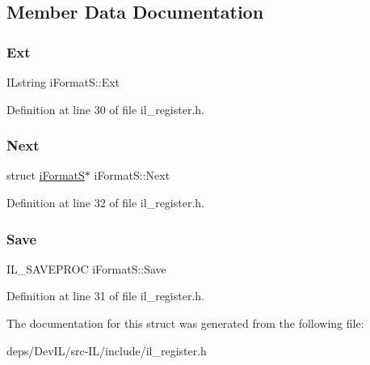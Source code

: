 \subsection{Member Data Documentation}
\mbox{\label{structiFormatS_abe2d034680c00ecec4bf1bc9b2398a3b}} 
\subsubsection{\texorpdfstring{Ext}{Ext}}
{\footnotesize\ttfamily I\+Lstring i\+Format\+S\+::\+Ext}



Definition at line 30 of file il\+\_\+register.\+h.

\mbox{\label{structiFormatS_a90ca384875594bd89739cfc1521416b9}} 
\subsubsection{\texorpdfstring{Next}{Next}}
{\footnotesize\ttfamily struct \hyperlink{structiFormatS}{i\+FormatS}$\ast$ i\+Format\+S\+::\+Next}



Definition at line 32 of file il\+\_\+register.\+h.

\mbox{\label{structiFormatS_ac70346735c2cf30fdcda183a93beb90e}} 
\subsubsection{\texorpdfstring{Save}{Save}}
{\footnotesize\ttfamily I\+L\+\_\+\+S\+A\+V\+E\+P\+R\+OC i\+Format\+S\+::\+Save}



Definition at line 31 of file il\+\_\+register.\+h.



The documentation for this struct was generated from the following file\+:\begin{DoxyCompactItemize}
\item 
deps/\+Dev\+I\+L/src-\/\+I\+L/include/il\+\_\+register.\+h\end{DoxyCompactItemize}
